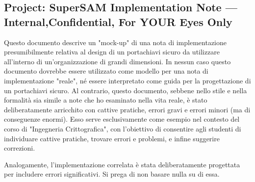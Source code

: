 \documentclass[11pt]{article}
\theoremstyle{definition} \newtheorem{definizione}{Definizione}[section] %
\begin{document}
        \subsection{Project: SuperSAM Implementation Note — Internal,Confidential, For YOUR Eyes Only}
        Questo documento descrive un "mock-up" di una nota di implementazione presumibilmente relativa al design di un portachiavi sicuro da utilizzare all'interno di un'organizzazione di grandi dimensioni. In nessun caso questo documento dovrebbe essere utilizzato come modello per una nota di implementazione "reale", né essere interpretato come guida per la progettazione di un portachiavi sicuro. Al contrario, questo documento, sebbene nello stile e nella formalità sia simile a note che ho esaminato nella vita reale, è stato deliberatamente arricchito con cattive pratiche, errori gravi e errori minori (ma di conseguenze enormi). Esso serve esclusivamente come esempio nel contesto del corso di "Ingegneria Crittografica", con l'obiettivo di consentire agli studenti di individuare cattive pratiche, trovare errori e problemi, e infine suggerire correzioni.

        Analogamente, l'implementazione correlata è stata deliberatamente progettata per includere errori significativi. Si prega di non basare nulla su di essa.
\end{document}
